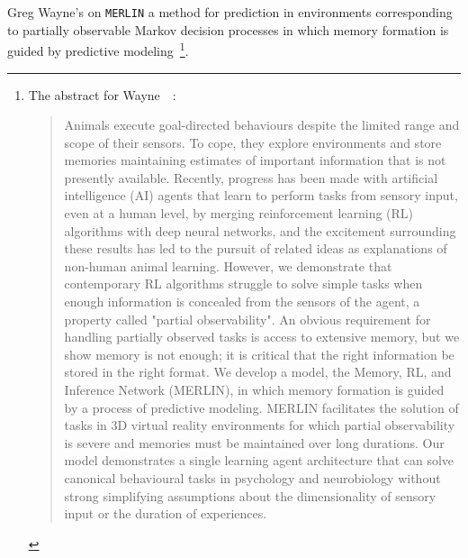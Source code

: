 Greg Wayne's {} on {\tt{MERLIN}} a method for prediction in environments corresponding to partially observable Markov decision processes in which memory formation is guided by predictive modeling~\cite{WayneetalCoRR-18}\footnote{%
%
  The abstract for Wayne~\etal{}~\cite{WayneetalCoRR-18}:
%
  \begin{quotation}
%
    Animals execute goal-directed behaviours despite the limited range and scope of their sensors. To cope, they explore environments and store memories maintaining estimates of important information that is not presently available. Recently, progress has been made with artificial intelligence (AI) agents that learn to perform tasks from sensory input, even at a human level, by merging reinforcement learning (RL) algorithms with deep neural networks, and the excitement surrounding these results has led to the pursuit of related ideas as explanations of non-human animal learning. However, we demonstrate that contemporary RL algorithms struggle to solve simple tasks when enough information is concealed from the sensors of the agent, a property called "partial observability". An obvious requirement for handling partially observed tasks is access to extensive memory, but we show memory is not enough; it is critical that the right information be stored in the right format. We develop a model, the Memory, RL, and Inference Network (MERLIN), in which memory formation is guided by a process of predictive modeling. MERLIN facilitates the solution of tasks in 3D virtual reality environments for which partial observability is severe and memories must be maintained over long durations. Our model demonstrates a single learning agent architecture that can solve canonical behavioural tasks in psychology and neurobiology without strong simplifying assumptions about the dimensionality of sensory input or the duration of experiences.
%
  \end{quotation}}.

